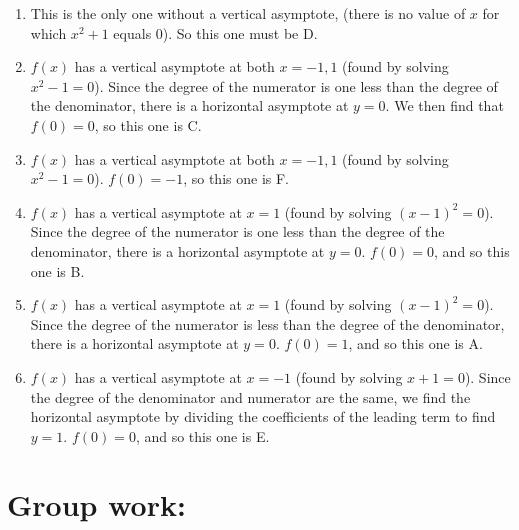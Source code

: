 \documentclass[handout,nooutcomes]{ximera}
\begin{document}
	
		\begin{freeResponse} 
			\begin{enumerate}[label=\arabic*.]  
			\item  This is the only one without a vertical asymptote, (there is no value of $x$ for which $x^2 + 1$ equals 0).  So this one must be D.
			
			\item  $f(x)$ has a vertical asymptote at both $x=-1,1$ (found by solving $x^2 - 1 = 0$).  Since the degree of the numerator is one less than the degree of the denominator, there is a horizontal asymptote at $y=0$.  We then find that $f(0)=0$, so this one is C.
			
			\item  $f(x)$ has a vertical asymptote at both $x=-1,1$ (found by solving $x^2 - 1 = 0$).  $f(0) = -1$, so this one is F.  
			
			\item  $f(x)$ has a vertical asymptote at $x=1$ (found by solving $(x-1)^2 = 0$).  Since the degree of the numerator is one less than the degree of the denominator, there is a horizontal asymptote at $y=0$.  $f(0)=0$, and so this one is B.
			
			\item  $f(x)$ has a vertical asymptote at $x=1$ (found by solving $(x-1)^2 = 0$).  Since the degree of the numerator is less than the degree of the denominator, there is a horizontal asymptote at $y=0$.  $f(0)=1$, and so this one is A.
			
			\item  $f(x)$ has a vertical asymptote at $x=-1$ (found by solving $x+1=0$).  Since the degree of the denominator and numerator are the same, we find the horizontal asymptote by dividing the coefficients of the leading term to find $y=1$.   $f(0)=0$, and so this one is E.
	\end{enumerate}
		\end{freeResponse}
	
	
	
	



\section*{Group work:}
\end{document}
